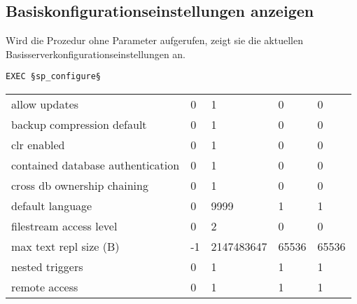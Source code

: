       \subsection{Basiskonfigurationseinstellungen anzeigen}
        Wird die Prozedur  ohne Parameter
        aufgerufen, zeigt sie die aktuellen
        Basisserverkonfigurationseinstellungen an.
      \begin{lstlisting}[language=ms_sql,caption={sp\_configure zur Anzeige
        der Basiskonfigurationswerte nutzen},label=admin03_05]
EXEC §sp_configure§
          \end{lstlisting}
        \begin{center}
          \begin{scriptsize}
            \tablehead{
            }
            \tabletail {
            }
            \tablelasttail {
            }
            \begin{mssql}
              \begin{supertabular}{lllll}
allow updates                     & 0  & 1          & 0     & 0 \\
backup compression default        & 0  & 1          & 0     & 0 \\
clr enabled                       & 0  & 1          & 0     & 0 \\
contained database authentication & 0  & 1          & 0     & 0 \\
cross db ownership chaining       & 0  & 1          & 0     & 0 \\
default language                  & 0  & 9999       & 1     & 1 \\
filestream access level           & 0  & 2          & 0     & 0 \\
max text repl size (B)            & -1 & 2147483647 & 65536 & 65536 \\
nested triggers                   & 0  & 1          & 1     & 1 \\
remote access                     & 0  & 1          & 1     & 1 \\

\end{supertabular}
\end{mssql}
\end{scriptsize}
\end{center}
